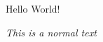 \documentclass{article}
\begin{document}
	Hello World!
	
	\emph{This is a normal text}
\end{document}
